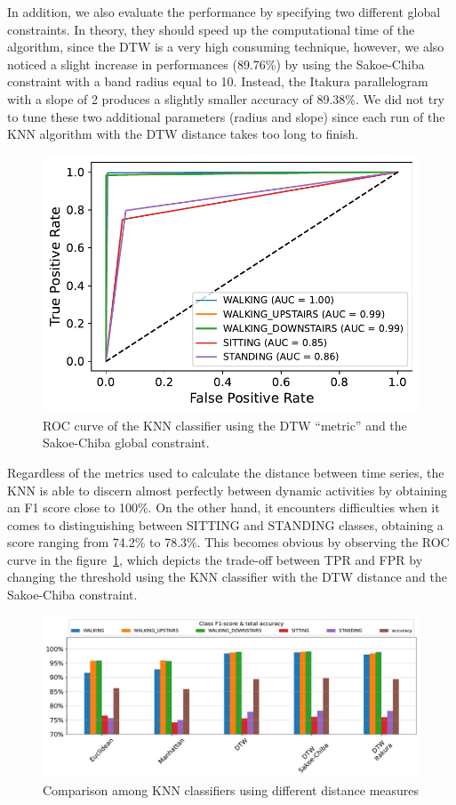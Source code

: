 \documentclass[10pt, a4paper, twocolumn]{article}
\begin{document}
In addition, we also evaluate the performance by specifying two different global constraints. In theory, they should speed up the computational time of the algorithm, since the DTW is a very high consuming technique, however, we also noticed a slight increase in performances (89.76\%) by using the Sakoe-Chiba constraint with a band radius equal to 10. Instead, the Itakura parallelogram with a slope of 2 produces a slightly smaller accuracy of 89.38\%. We did not try to tune these two additional parameters (radius and slope) since each run of the KNN algorithm with the DTW distance takes too long to finish. 

\begin{figure}
    \centering
    \includegraphics[width=0.6\linewidth]{immagini simone/output_86_1.pdf}
    \caption{ROC curve of the KNN classifier using the DTW ``metric'' and the Sakoe-Chiba global constraint.}
    \label{fig:roc_knn_sakoechiba}
\end{figure}

Regardless of the metrics used to calculate the distance between time series, the KNN is able to discern almost perfectly between dynamic activities by obtaining an F1 score close to 100\%. On the other hand, it encounters difficulties when it comes to distinguishing between SITTING and STANDING classes, obtaining a score ranging from 74.2\% to 78.3\%. This becomes obvious by observing the ROC curve in the figure~\ref{fig:roc_knn_sakoechiba}, which depicts the trade-off between TPR and FPR by changing the threshold using the KNN classifier with the DTW distance and the Sakoe-Chiba constraint. 

\begin{figure}
	\centering
	\includegraphics[width=\columnwidth]{immagini simone/output_84_0.pdf}
	\caption{Comparison among KNN classifiers using different distance measures}
	\label{fig:KNN_comparisons}
\end{figure}
\end{document}
